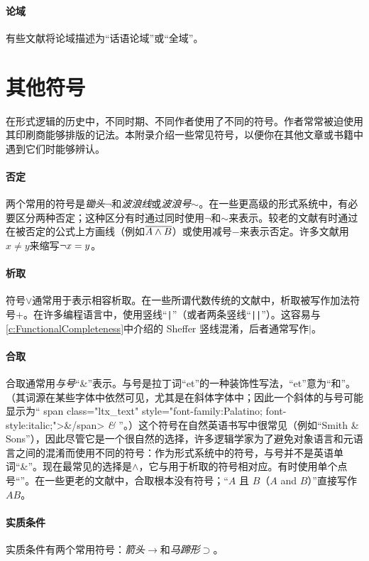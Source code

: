 \paragraph{论域} 有些文献将论域描述为“话语论域”或“全域”。

\section{其他符号}
在形式逻辑的历史中，不同时期、不同作者使用了不同的符号。作者常常被迫使用其印刷商能够排版的记法。本附录介绍一些常见符号，以便你在其他文章或书籍中遇到它们时能够辨认。

\paragraph{否定} 两个常用的符号是\emph{锄头}$\neg$和\emph{波浪线}或\emph{波浪号}${\sim}$。在一些更高级的形式系统中，有必要区分两种否定；这种区分有时通过同时使用$\neg$和${\sim}$来表示。较老的文献有时通过在被否定的公式上方画线（例如$\overline{A \wedge B}$）或使用减号$-$来表示否定。许多文献用$x \neq y$来缩写$\neg x = y$。

\paragraph{析取} 符号$\vee$通常用于表示相容析取。在一些所谓代数传统的文献中，析取被写作加法符号$+$。在许多编程语言中，使用竖线“\verb+|+”（或者两条竖线“\verb+||+”）。这容易与\cref{c:FunctionalCompleteness}中介绍的 Sheffer 竖线混淆，后者通常写作$\mid$。

\paragraph{合取}
合取通常用\emph{与号}“{\&}”表示。与号是拉丁词“et”的一种装饰性写法，“et”意为“和”。（其词源在某些字体中依然可见，尤其是在斜体字体中；因此一个斜体的与号可能显示为“%
\iflatexml
\<span class="ltx\_text" style="font-family:Palatino; font-style:italic;">\&\</span>
\else
\emph{\&}
\fi
”。）这个符号在自然英语书写中很常见（例如“Smith \& Sons”），因此尽管它是一个很自然的选择，许多逻辑学家为了避免对象语言和元语言之间的混淆而使用不同的符号：作为形式系统中的符号，与号并不是英语单词“\&”。现在最常见的选择是$\wedge$，它与用于析取的符号相对应。有时使用单个点号“{\scriptsize\textbullet}”。在一些更老的文献中，合取根本没有符号；“$A$ 且 $B$（$A$ and $B$）”直接写作$AB$。

\paragraph{实质条件} 实质条件有两个常用符号：\emph{箭头}$\rightarrow$和\emph{马蹄形}$\supset$。

